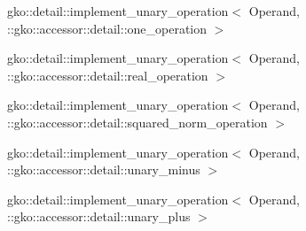\begin{DoxyCompactList}
\begin{DoxyCompactList}
\item {}
\end{DoxyCompactList}
\item gko\+:\+:detail\+:\+:implement\+\_\+unary\+\_\+operation$<$ Operand, \+:\+:gko\+:\+:accessor\+:\+:detail\+:\+:one\+\_\+operation $>$\begin{DoxyCompactList}
\item {}
\end{DoxyCompactList}
\item gko\+:\+:detail\+:\+:implement\+\_\+unary\+\_\+operation$<$ Operand, \+:\+:gko\+:\+:accessor\+:\+:detail\+:\+:real\+\_\+operation $>$\begin{DoxyCompactList}
\item {}
\end{DoxyCompactList}
\item gko\+:\+:detail\+:\+:implement\+\_\+unary\+\_\+operation$<$ Operand, \+:\+:gko\+:\+:accessor\+:\+:detail\+:\+:squared\+\_\+norm\+\_\+operation $>$\begin{DoxyCompactList}
\item {}
\end{DoxyCompactList}
\item gko\+:\+:detail\+:\+:implement\+\_\+unary\+\_\+operation$<$ Operand, \+:\+:gko\+:\+:accessor\+:\+:detail\+:\+:unary\+\_\+minus $>$\begin{DoxyCompactList}
\item {}
\end{DoxyCompactList}
\item gko\+:\+:detail\+:\+:implement\+\_\+unary\+\_\+operation$<$ Operand, \+:\+:gko\+:\+:accessor\+:\+:detail\+:\+:unary\+\_\+plus $>$\begin{DoxyCompactList}
\item {}

\end{DoxyCompactList}
\end{DoxyCompactList}
